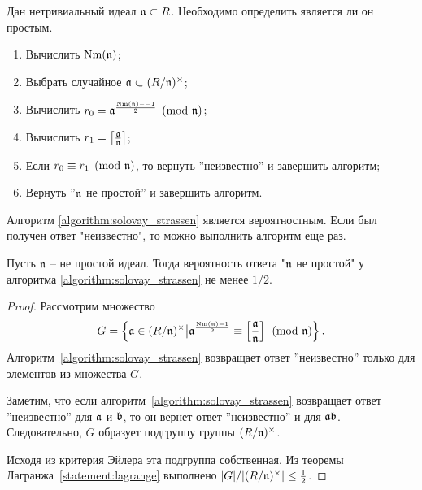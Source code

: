 \documentclass[_00_dissertation.tex]{subfiles}
\begin{document}
\begin{algorithm}\label{algorithm:solovay_strassen}
    Дан нетривиальный идеал $\mathfrak{n} \subset R$.
    Необходимо определить является ли он простым.

    \begin{enumerate}
        \item Вычислить $\textrm{Nm}(\mathfrak{n})$;
        
        \item Выбрать случайное $\mathfrak{a} \subset (R/\mathfrak{n})^{\times}$;

        \item Вычислить $r_0 = \mathfrak{a}^{\frac{\textrm{Nm}(\mathfrak{n}) -- 1}{2}} \pmod{\mathfrak{n}}$;

        \item Вычислить $r_1 = \left[\frac{\mathfrak{a}}{\mathfrak{n}}\right]$;

        \item Если $r_0 \equiv r_1 \pmod{\mathfrak{n}}$, то вернуть ''неизвестно'' и завершить алгоритм;

        \item Вернуть ''$\mathfrak{n}$ не простой'' и завершить алгоритм.
    \end{enumerate}
\end{algorithm}

\begin{remark}
    Алгоритм \ref{algorithm:solovay_strassen} является вероятностным.
    Если был получен ответ "неизвестно", то можно выполнить алгоритм еще раз.
\end{remark}

\begin{proposition}
    Пусть $\mathfrak{n}$ -- не простой идеал.
    Тогда вероятность ответа "$\mathfrak{n}$ не простой" у алгоритма \ref{algorithm:solovay_strassen} не менее $1/2$.
\end{proposition}
\begin{proof}
    Рассмотрим множество
    \begin{equation*}
        G = \left\{
            \mathfrak{a} \in (R/\mathfrak{n})^{\times} \big| \mathfrak{a}^{\frac{\textrm{Nm}(\mathfrak{n}) - 1}{2}} \equiv \left[\frac{\mathfrak{a}}{\mathfrak{n}}\right] \pmod{\mathfrak{n}}
        \right\}.
    \end{equation*}
    Алгоритм~\ref{algorithm:solovay_strassen} возвращает ответ ''неизвестно'' только для элементов из множества $G$.

    Заметим, что если алгоритм~\ref{algorithm:solovay_strassen} возвращает ответ ''неизвестно'' для $\mathfrak{a}$ и $\mathfrak{b}$, то он вернет ответ ''неизвестно'' и для $\mathfrak{a}\mathfrak{b}$.
    Следовательно, $G$ образует подгруппу группы $(R/\mathfrak{n})^{\times}$.

    Исходя из критерия Эйлера эта подгруппа собственная.
    Из теоремы Лагранжа~\ref{statement:lagrange} выполнено $|G|/|(R/\mathfrak{n})^{\times}| \le \frac{1}{2}$.
\end{proof}
\end{document}
